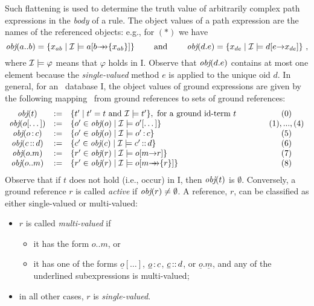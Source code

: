 Such flattening is used to determine the truth value of
arbitrarily complex path expressions in the \emph{body} of a rule.
The object values \obj of a path expression are
the names of the referenced objects: e.g., for $(*)$ we have
\begin{displaymath}
\textit{obj}(a..b) = \{x_{ab} \mid \mathcal{I} \models a[b{\rightarrow\!\!\!\!\rightarrow}\{x_{ab}\}]\}
\qquad\textrm{ and }\qquad \textit{obj}(d.e) = \{x_{de} \mid \mathcal{I} \models d[e{\rightarrow} 
x_{de}]\} ~,
\end{displaymath}
%
where $\mathcal{I} \models \varphi$ means that $\varphi$ holds in \db I.
Observe that $\textit{obj}(d.e)$ contains at most one element because the
\emph{single-valued} method $e$ is applied to the unique oid $d$.  In
general, for an \fl\ database \db I, the object values of ground
expressions are given by the following mapping \obj\ from ground
references to sets of ground references:
%
\begin{displaymath}
  \begin{array}{cll@{\hspace{4em}}c}
    \obj(t) & := & \{t' \mid t'=t \textrm{ and } \db I\models t' \}, 
     \textrm{ for a ground id-term $t$}  & (0) \\   
    \obj(o[\dots]) & :=& \{o'\in\obj(o) \mid \db I \models o'[\dots]
    \}& (1),...,(4)\\  
    \obj(o\isa c) & := & \{o'\in\obj(o) \mid \db I \models o'\isa c\} &
    (5) \\ 
    \obj(c\subcl d) & := & \{c'\in\obj(c) \mid \db I \models c'\subcl
    d\} &  (6)\\ 
    \obj(o.m) & :=  & \{r'\in\obj(r) \mid \db I \models o[m\fd
    r]\}  &  (7)\\ 
    \obj(o..m) & := &  \{ r'\in\obj(r) \mid \db I \models
    o[m{\mvd}\{r\}] \} & (8)   
  \end{array}
\end{displaymath}
Observe that if $t$ does not hold (i.e., occur) in \db I, then $\textit{obj}(t)$ is
$\emptyset$.  Conversely, a ground reference $r$ is called \emph{active} if
$\textit{obj}(r)\neq\emptyset$. A reference, $r$, can be classified as either
single-valued or multi-valued:
\begin{itemize}
\item $r$ is called \emph{multi-valued} if
 \begin{itemize}
  \item it has the form $o..m$, or 
  \item it has one of the forms $\underline{o}[\dots]$,
    $\underline{o}\,{\bf{:}}\, c$, $\underline{c}\,{\bf{::}}\, d$, or
    $\underline{o}.\underline{m}$, and any of the underlined
    subexpressions is multi-valued;
 \end{itemize}
\item in all other cases, $r$ is \emph{single-valued}.
\end{itemize}


